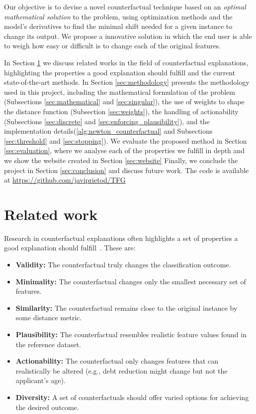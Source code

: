 \documentclass[12pt]{extarticle}
\numberwithin{equation}{section}
\begin{document}
Our objective is to devise a novel counterfactual technique based on an \emph{optimal mathematical solution} to the problem, using optimization methods and the model's derivatives to find the minimal shift needed for a given instance to change its output. We propose a innovative solution in which the end user is able to weigh how easy or difficult is to change each of the original features.

In Section \ref{sec:related} we discuss related works in the field of counterfactual explanations, highlighting the properties a good explanation should fulfill and the current state-of-the-art methods. In Section \ref{sec:methodology} presents the methodology used in this project, including the mathematical formulation of the problem (Subsections \ref{sec:mathematical} and \ref{sec:singular}), the use of weights to shape the distance function (Subsection \ref{sec:weights}), the handling of actionability (Subsections \ref{sec:discrete} and \ref{sec:enforcing_plausibility}), and the implementation details(\autoref{alg:newton_counterfactual} and Subsections \ref{sec:threshold} and \ref{sec:stopping}). We evaluate the proposed method in Section \ref{sec:evaluation}, where we analyse each of the properties we fulfill in depth and we show the website created in Section \ref{sec:website}
Finally, we conclude the project in Section \ref{sec:conclusion} and discuss future work. The code is available at \url{https://github.com/javiprietod/TFG}

\section{Related work}\label{sec:related} 
Research in counterfactual explanations often highlights a set of properties a good explanation should fulfill~\cite{guidotti2024counterfactual}. These are:
\begin{itemize}
  \item \textbf{Validity:} The counterfactual truly changes the classification outcome.
  \item \textbf{Minimality:} The counterfactual changes only the smallest necessary set of features.
  \item \textbf{Similarity:} The counterfactual remains close to the original instance by some distance metric.
  \item \textbf{Plausibility:} The counterfactual resembles realistic feature values found in the reference dataset.
  \item \textbf{Actionability:} The counterfactual only changes features that can realistically be altered (e.g., debt reduction might change but not the applicant's age).
  \item \textbf{Diversity:} A set of counterfactuals should offer varied options for achieving the desired outcome.
\end{itemize}
\end{document}
